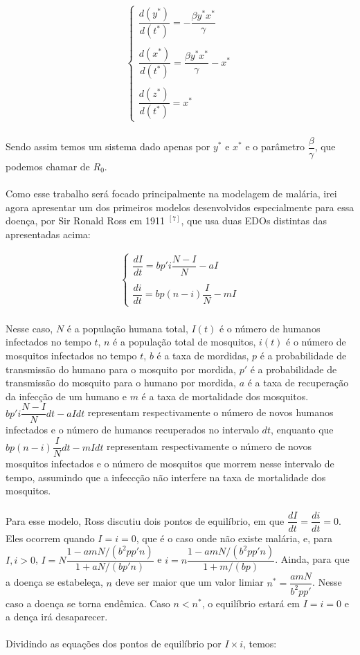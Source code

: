 \documentclass[12pt]{article}
\begin{document}
\begin{gather*}
\begin{cases}
\dfrac{d(y^*)}{d(t^*)} = -\dfrac{\beta y^*x^*}{\gamma} \\
\\
\dfrac{d(x^*)}{d(t^*)} = \dfrac{\beta y^*x^*}{\gamma} - x^* \\
\\
\dfrac{d(z^*)}{d(t^*)} = x^*
\end{cases}
\end{gather*}
\\
Sendo assim temos um sistema dado apenas por $y^*$ e $x^*$ e o parâmetro $\dfrac{\beta}{\gamma}$, que podemos chamar de $R_0$.
\\\\
Como esse trabalho será focado principalmente na modelagem de malária, irei agora apresentar um dos primeiros modelos desenvolvidos especialmente para essa doença, por Sir Ronald Ross em 1911 $^{[7]}$, que usa duas EDOs distintas das apresentadas acima:

\begin{gather*}
\begin{cases}
\dfrac{dI}{dt} = bp'i\dfrac{N-I}{N} -aI\\
\\
\dfrac{di}{dt} = bp(n-i)\dfrac{I}{N} - mI
\end{cases}
\end{gather*}
\\
Nesse caso, $N$ é a população humana total, $I(t)$ é o número de humanos infectados no tempo $t$, $n$ é a população total de mosquitos, $i(t)$ é o número de mosquitos infectados no tempo $t$, $b$ é a taxa de mordidas, $p$ é a probabilidade de transmissão do humano para o mosquito por mordida, $p'$ é a probabilidade de transmissão do mosquito para o humano por mordida, $a$ é a taxa de recuperação da infecção de um humano e $m$ é a taxa de mortalidade dos mosquitos. $bp'i\dfrac{N-I}{N}dt -aIdt$ representam respectivamente o número de novos humanos infectados e o número de humanos recuperados no intervalo $dt$, enquanto que $bp(n-i)\dfrac{I}{N}dt - mIdt$ representam respectivamente o número de novos mosquitos infectados e o número de mosquitos que morrem nesse intervalo de tempo, assumindo que a infeccção não interfere na taxa de mortalidade dos mosquitos.
\\\\
Para esse modelo, Ross discutiu dois pontos de equilíbrio, em que $\dfrac{dI}{dt} = \dfrac{di}{dt} = 0$. Eles ocorrem quando $I=i=0$, que é o caso onde não existe malária, e, para $I, i > 0$, $I = N\dfrac{1-amN/(b^2pp'n)}{1+aN/(bp'n)}$ e $i = n\dfrac{1-amN/(b^2pp'n)}{1+m/(bp)}$. Ainda, para que a doença se estabeleça, $n$ deve ser maior que um valor limiar $n^* = \dfrac{amN}{b^2pp'}$. Nesse caso a doença se torna endêmica. Caso $n<n^*$, o equilíbrio estará em $I=i=0$ e a dença irá desaparecer.
\\\\
Dividindo as equações dos pontos de equilíbrio por $I \times i$, temos:
\end{document}
